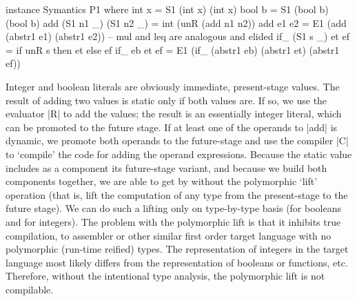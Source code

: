 \documentclass[preprint]{sigplanconf}
\begin{document}
\begin{code}
instance Symantics P1 where
    int  x  = S1 (int x) (int x)
    bool b  = S1 (bool b) (bool b)
    add (S1 n1 _) (S1 n2 _) = int (unR (add n1 n2))
    add e1 e2 = E1 (add (abstr1 e1) (abstr1 e2))
    -- mul and leq are analogous and elided
    if_ (S1 s _) et ef = if unR s then et else ef
    if_ eb et ef = 
       E1 (if_ (abstr1 eb) (abstr1 et) (abstr1 ef))
\end{code}
Integer and boolean literals are obviously immediate, present-stage
values. The result of adding two values is static only if both values
are. If so, we use the evaluator |R| to add the values; the result is
an essentially integer literal, which can be promoted to the future
stage. If at least one of the operands to |add| is dynamic, we promote
both operands to the future-stage and use the compiler |C| to
`compile' the code for adding the operand expressions.  Because the
static value includes as a component its future-stage variant, and
because we build both components together, we are able to get by
without the polymorphic `lift' operation (that is, lift the
computation of any type from the present-stage to the future
stage). We can do such a lifting only on type-by-type basis (for
booleans and for integers). The problem with the polymorphic lift is
that it inhibits true compilation, to assembler or other similar first
order target language with no polymorphic (run-time reified) types.
The representation of integers in the target language most likely
differs from the representation of booleans or functions,
etc. Therefore, without the intentional type analysis, the polymorphic
lift is not compilable.
\end{document}
